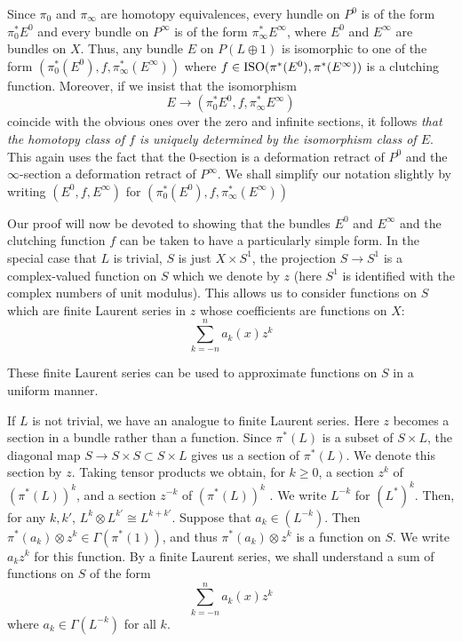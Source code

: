 Since $\pi_0$ and $\pi_\infty$ are homotopy equivalences, every hundle on $P^0$ is of the form $\pi^*_0 E^0$ and every bundle on $P^\infty$ is of the form $\pi^*_\infty E^\infty$, where $E^0$ and $E^\infty$ are bundles on $X$. Thus, any bundle $E$ on $P(L \oplus 1)$ is isomorphic to one of the form $(\pi^*_0(E^0), f, \pi^*_\infty(E^\infty))$ where $f \in \operatorname{ISO}(\pi^*(E^0), \pi^*(E^\infty))$ is a clutching function. Moreover, if we insist that the isomorphism
\begin{equation*}
    E \to (\pi^*_0 E^0, f, \pi^*_\infty E^\infty)
\end{equation*}
coincide with the obvious ones over the zero and infinite sections, it follows \textit{that the homotopy class of $f$ is uniquely determined by the isomorphism class of $E$}. This again uses the fact that the $0$-section is a deformation retract of $P^0$ and the $\infty$-section a deformation retract of $P^\infty$. We shall simplify our notation slightly by writing $(E^0, f, E^\infty)$ for $(\pi^*_0(E^0), f, \pi^*_\infty(E^\infty))$ \par 

Our proof will now be devoted to showing that the bundles $E^0$ and $E^\infty$ and the clutching function $f$ can be taken to have a particularly simple form. In the special case that $L$ is trivial, $S$ is just $X \times S^1$, the projection $S \to S^1$ is a complex-valued function on $S$ which we denote by $z$ (here $S^1$ is identified with the complex numbers of unit modulus). This allows us to consider functions on $S$ which are finite Laurent series in $z$ whose coefficients are functions on $X$:
\begin{equation*}
    \sum_{k = -n}^n a_k(x) z^k
\end{equation*}

These finite Laurent series can be used to approximate functions on $S$ in a uniform manner. \par 

If $L$ is not trivial, we have an analogue to finite Laurent series. Here $z$ becomes a section in a bundle rather than a function. Since $\pi^*(L)$ is a subset of $S \times L$, the diagonal map $S \to S \times S \subset S \times L$ gives us a section of $\pi^*(L)$. We denote this section by $z$. Taking tensor products we obtain, for $k \geq 0$, a section $z^k$ of $(\pi^*(L))^k$, and a section $z^{-k}$ of $(\pi^*(L))^k$ . We write $L^{-k}$ for $(L^*)^k$. Then, for any $k, k'$, $L^k \otimes L^{k'} \cong L^{k+k'}$. Suppose that $a_k \in (L^{-k})$. Then $\pi^*(a_k) \otimes z^k \in \Gamma(\pi^*(1))$, and thus $\pi^*(a_k) \otimes z^k$ is a function on $S$. We write $a_k z^k$ for this function. By a finite Laurent series, we shall understand a sum of functions on $S$ of the form
\begin{equation*}
    \sum_{k = -n}^n a_k(x) z^k
\end{equation*}
where $a_k \in \Gamma(L^{-k})$ for all $k$. \par 

